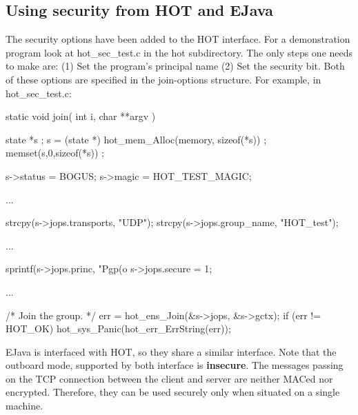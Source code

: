 \subsection{Using security from HOT and EJava}
The security options have been added to the HOT interface. For a
demonstration program look at hot\_sec\_test.c in the hot subdirectory. 
The only steps one needs to make are: (1) Set the program's principal
name (2) Set the security bit. Both of these options are specified in the
join-options structure. For example, in hot\_sec\_test.c:
\begin{codebox}
static void join(
		 int i,
		 char **argv
) {
  state *s ;
  s = (state *) hot_mem_Alloc(memory, sizeof(*s)) ;
  memset(s,0,sizeof(*s)) ;
  
  s->status = BOGUS;
  s->magic = HOT_TEST_MAGIC;

  ...

  strcpy(s->jops.transports, "UDP");
  strcpy(s->jops.group_name, "HOT_test");
  
  ...

  sprintf(s->jops.princ, "Pgp(o%
  s->jops.secure = 1;

  ...
  
  /* Join the group.
   */
  err = hot_ens_Join(&s->jops, &s->gctx);
  if (err != HOT_OK) {
    hot_sys_Panic(hot_err_ErrString(err));
  }

}
\end{codebox}

EJava is interfaced with HOT, so they share a similar interface. Note
that the outboard mode, supported by both interface is {\bf
insecure}. The messages passing on the TCP connection between the
client and server are neither MACed nor encrypted. Therefore, they can
be used securely only when situated on a single machine. 


